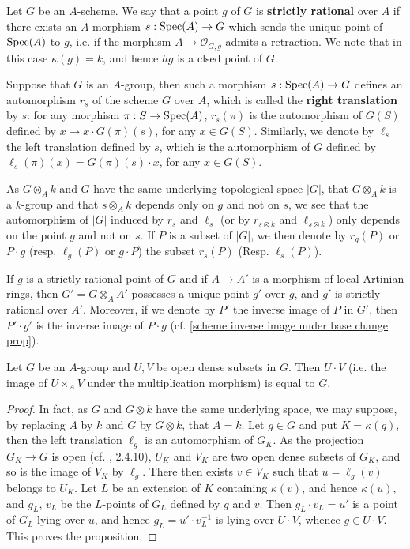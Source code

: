 Let $G$ be an $A$-scheme. We say that a point $g$ of $G$ is \textbf{strictly rational} over $A$ if there exists an $A$-morphism $s:\mathrm{Spec}(A)\to G$ which sends the unique point of $\mathrm{Spec}(A)$ to $g$, i.e. if the morphism $A\to\mathscr{O}_{G,g}$ admits a retraction. We note that in this case $\kappa(g)=k$, and hence $hg$ is a clsed point of $G$.\par
Suppose that $G$ is an $A$-group, then such a morphism $s:\mathrm{Spec}(A)\to G$ defines an automorphism $r_s$ of the scheme $G$ over $A$, which is called the \textbf{right translation} by $s$: for any morphism $\pi:S\to\mathrm{Spec}(A)$, $r_s(\pi)$ is the automorphism of $G(S)$ defined by $x\mapsto x\cdot G(\pi)(s)$, for any $x\in G(S)$. Similarly, we denote by $\ell_s$ the left translation defined by $s$, which is the automorphism of $G$ defined by $\ell_s(\pi)(x)=G(\pi)(s)\cdot x$, for any $x\in G(S)$.\par
As $G\otimes_Ak$ and $G$ have the same underlying topological space $|G|$, that $G\otimes_Ak$ is a $k$-group and that $s\otimes_Ak$ depends only on $g$ and not on $s$, we see that the automorphism of $|G|$ induced by $r_s$ and $\ell_s$ (or by $r_{s\otimes k}$ and $\ell_{s\otimes k}$) only depends on the point $g$ and not on $s$. If $P$ is a subset of $|G|$, we then denote by $r_g(P)$ or $P\cdot g$ (resp. $\ell_g(P)$ or $g\cdot P$) the subset $r_s(P)$ (Resp. $\ell_s(P)$).

\begin{remark}\label{scheme A-group strict rational stable under base change remark}
If $g$ is a strictly rational point of $G$ and if $A\to A'$ is a morphism of local Artinian rings, then $G'=G\otimes_AA'$ possesses a unique point $g'$ over $g$, and $g'$ is strictly rational over $A'$. Moreover, if we denote by $P'$ the inverse image of $P$ in $G'$, then $P'\cdot g'$ is the inverse image of $P\cdot g$ (cf. \cref{scheme inverse image under base change prop}).
\end{remark}

\begin{proposition}\label{scheme A-group product of open dense is G}
Let $G$ be an $A$-group and $U,V$ be open dense subsets in $G$. Then $U\cdot V$ (i.e. the image of $U\times_AV$ under the multiplication morphism) is equal to $G$.
\end{proposition}
\begin{proof}
In fact, as $G$ and $G\otimes k$ have the same underlying space, we may suppose, by replacing $A$ by $k$ and $G$ by $G\otimes k$, that $A=k$. Let $g\in G$ and put $K=\kappa(g)$, then the left translation $\ell_g$ is an automorphism of $G_K$. As the projection $G_K\to G$ is open (cf. \cite{EGA4-2}, 2.4.10), $U_K$ and $V_K$ are two open dense subsets of $G_K$, and so is the image of $V_K$ by $\ell_g$. There then exists $v\in V_K$ such that $u=\ell_g(v)$ belongs to $U_K$. Let $L$ be an extension of $K$ containing $\kappa(v)$, and hence $\kappa(u)$, and $g_L$, $v_L$ be the $L$-points of $G_L$ defined by $g$ and $v$. Then $g_L\cdot v_L=u'$ is a point of $G_L$ lying over $u$, and hence $g_L=u'\cdot v_L^{-1}$ is lying over $U\cdot V$, whence $g\in U\cdot V$. This proves the proposition.
\end{proof}

